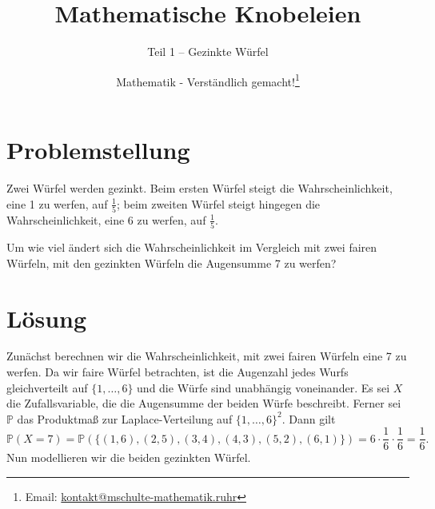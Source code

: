 \documentclass[]{scrartcl}
\title{Mathematische Knobeleien}
\subtitle{Teil 1 -- Gezinkte Würfel}
\author{Mathematik - Verständlich gemacht!\footnote{Email: \href{mailto:kontakt@mschulte-mathematik.ruhr}{kontakt@mschulte-mathematik.ruhr}}}
\begin{document}
\maketitle

\section*{Problemstellung}
Zwei Würfel werden gezinkt. Beim ersten Würfel steigt die Wahrscheinlichkeit, eine 1 zu
werfen, auf $\frac{1}{5}$; beim zweiten Würfel steigt hingegen die Wahrscheinlichkeit, eine 6
zu werfen, auf $\frac{1}{5}$.

\noindent 
Um wie viel ändert sich die Wahrscheinlichkeit im Vergleich mit zwei fairen Würfeln, mit den
gezinkten Würfeln die Augensumme 7 zu werfen?

\section*{Lösung}
Zunächst berechnen wir die Wahrscheinlichkeit, mit zwei fairen Würfeln eine 7 zu werfen.
Da wir faire Würfel betrachten, ist die Augenzahl jedes Wurfs gleichverteilt auf $\{1,\ldots,6\}$
und die Würfe sind unabhängig voneinander. Es sei $X$ die Zufallsvariable, die die Augensumme
der beiden Würfe beschreibt. Ferner sei $\mathbb{P}$ das Produktmaß zur
Laplace-Verteilung auf $\{1,\ldots,6\}^2$. Dann gilt
$$
\mathbb{P}(X=7) = \mathbb{P}(\{ (1,6), (2,5), (3,4), (4,3), (5,2), (6,1) \}) = 6 \cdot
\frac{1}{6} \cdot \frac{1}{6} = \frac{1}{6}.
$$
Nun modellieren wir die beiden gezinkten Würfel.
\end{document}

